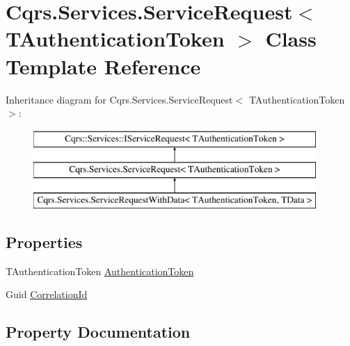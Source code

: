\hypertarget{classCqrs_1_1Services_1_1ServiceRequest}{}\section{Cqrs.\+Services.\+Service\+Request$<$ T\+Authentication\+Token $>$ Class Template Reference}
\label{classCqrs_1_1Services_1_1ServiceRequest}
Inheritance diagram for Cqrs.\+Services.\+Service\+Request$<$ T\+Authentication\+Token $>$\+:\begin{figure}[H]
\begin{center}
\leavevmode
\includegraphics[height=3.000000cm]{classCqrs_1_1Services_1_1ServiceRequest}
\end{center}
\end{figure}
\subsection*{Properties}
\begin{DoxyCompactItemize}
\item 
T\+Authentication\+Token \hyperlink{classCqrs_1_1Services_1_1ServiceRequest_ac1a9faff43be83d010b5b59a849c4c4b_ac1a9faff43be83d010b5b59a849c4c4b}{Authentication\+Token}
\item 
Guid \hyperlink{classCqrs_1_1Services_1_1ServiceRequest_abbf7a905744ac65ab59edf4f550cad61_abbf7a905744ac65ab59edf4f550cad61}{Correlation\+Id}
\end{DoxyCompactItemize}


\subsection{Property Documentation}
\mbox{\label{classCqrs_1_1Services_1_1ServiceRequest_ac1a9faff43be83d010b5b59a849c4c4b_ac1a9faff43be83d010b5b59a849c4c4b}} 
